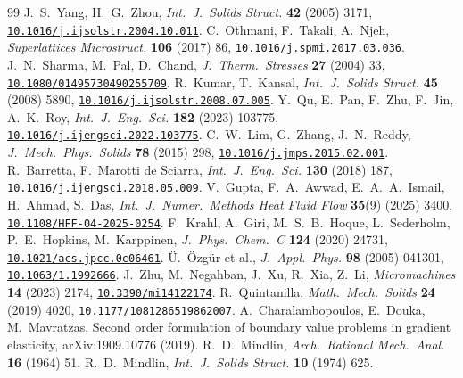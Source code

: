 \documentclass[11pt]{article}
\newcommand{\doi}[1]{\href{https://doi.org/#1}{\texttt{#1}}}
\begin{document}
\begin{thebibliography}{99}
\small
{} J.~S.~Yang, H.~G.~Zhou, \emph{Int.\ J.\ Solids Struct.} \textbf{42} (2005) 3171, \doi{10.1016/j.ijsolstr.2004.10.011}.
 C.~Othmani, F.~Takali, A.~Njeh, \emph{Superlattices Microstruct.} \textbf{106} (2017) 86, \doi{10.1016/j.spmi.2017.03.036}.
 J.~N.~Sharma, M.~Pal, D.~Chand, \emph{J.\ Therm.\ Stresses} \textbf{27} (2004) 33, \doi{10.1080/01495730490255709}.
 R.~Kumar, T.~Kansal, \emph{Int.\ J.\ Solids Struct.} \textbf{45} (2008) 5890, \doi{10.1016/j.ijsolstr.2008.07.005}.
 Y.~Qu, E.~Pan, F.~Zhu, F.~Jin, A.~K.~Roy, \emph{Int.\ J.\ Eng.\ Sci.} \textbf{182} (2023) 103775, \doi{10.1016/j.ijengsci.2022.103775}.
 C.~W.~Lim, G.~Zhang, J.~N.~Reddy, \emph{J.\ Mech.\ Phys.\ Solids} \textbf{78} (2015) 298, \doi{10.1016/j.jmps.2015.02.001}.
 R.~Barretta, F.~Marotti de Sciarra, \emph{Int.\ J.\ Eng.\ Sci.} \textbf{130} (2018) 187, \doi{10.1016/j.ijengsci.2018.05.009}.
 V.~Gupta, F.~A.~Awwad, E.~A.~A.~Ismail, H.~Ahmad, S.~Das, \emph{Int.\ J.\ Numer.\ Methods Heat Fluid Flow} \textbf{35}(9) (2025) 3400, \doi{10.1108/HFF-04-2025-0254}.
 F.~Krahl, A.~Giri, M.~S.~B.~Hoque, L.~Sederholm, P.~E.~Hopkins, M.~Karppinen, \emph{J.\ Phys.\ Chem.\ C} \textbf{124} (2020) 24731, \doi{10.1021/acs.jpcc.0c06461}.
 \"U.~\"Ozg\"ur et al., \emph{J.\ Appl.\ Phys.} \textbf{98} (2005) 041301, \doi{10.1063/1.1992666}.
 J.~Zhu, M.~Negahban, J.~Xu, R.~Xia, Z.~Li, \emph{Micromachines} \textbf{14} (2023) 2174, \doi{10.3390/mi14122174}.
 R.~Quintanilla, \emph{Math.\ Mech.\ Solids} \textbf{24} (2019) 4020, \doi{10.1177/1081286519862007}.
 A.~Charalambopoulos, E.~Douka, M.~Mavratzas, Second order formulation of boundary value problems in gradient elasticity, arXiv:1909.10776 (2019).
 R.~D.~Mindlin, \emph{Arch.\ Rational Mech.\ Anal.} \textbf{16} (1964) 51.
 R.~D.~Mindlin, \emph{Int.\ J.\ Solids Struct.} \textbf{10} (1974) 625.
\end{thebibliography}
\end{document}
